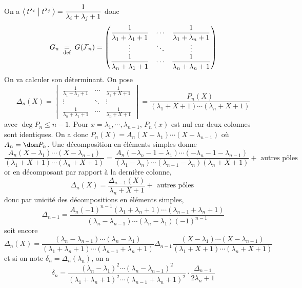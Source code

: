 On a $\scalar{t^{\lambda_i}}{t^{\lambda_j}} = \dfrac{1}{\lambda_i+\lambda_j+1}$ donc \[
    G_n\;\underset{\text{def}}=\; G(\mathcal  F_n)= \begin{pmatrix}
        \displaystyle \frac{1}{\lambda_1+\lambda_1+1} & \cdots  & \displaystyle\frac{1}{\lambda_1+\lambda_n+1} \\
        \vdots & \ddots & \vdots \\
        \displaystyle \frac{1}{\lambda_n+\lambda_1+1} & \cdots  & \displaystyle\frac{1}{\lambda_n+\lambda_n+1}
    \end{pmatrix}
\] 
On va calculer son déterminant. On pose \[
    \Delta_n(X)= \begin{vmatrix}
        \displaystyle \frac{1}{\lambda_1+\lambda_1+1} & \cdots  & \displaystyle\frac{1}{\lambda_1+X+1} \\
        \vdots & \ddots & \vdots \\
        \displaystyle \frac{1}{\lambda_n+\lambda_1+1} & \cdots  & \displaystyle\frac{1}{\lambda_n+X+1}
    \end{vmatrix}= \frac{P_n(X)}{(\lambda_1+X+1)\cdots (\lambda_n+X+1)}
\] 
avec $\deg P_n\leq n-1$. Pour $x=\lambda_1, \cdots , \lambda_{n-1}$, $P_n(x)$ est nul car deux colonnes sont identiques. On a donc $P_n(X)=A_n(X-\lambda_1)\cdots (X-\lambda_{n-1})$ où $A_n=\dom P_n$. Une décomposition en éléments simples donne \[
    \frac{A_n(X-\lambda_1)\cdots (X-\lambda_{n-1})}{(\lambda_1+X+1)\cdots (\lambda_n+X+1)}= \frac{A_n(-\lambda_{n}-1-\lambda_1)\cdots (-\lambda_n-1-\lambda_{n-1})}{(\lambda_1-\lambda_n)\cdots (\lambda_{n-1}-\lambda_n)(\lambda_n+X+1)}+\text{ autres pôles }
\] 
or en décomposant par rapport à la dernière colonne, \[
    \Delta_n(X)=\frac{\Delta_{n-1}(X)}{\lambda_n+X+1}+\text{ autres pôles }
\] 
donc par unicité des décompositions en éléments simples, \[
    \Delta_{n-1}= \frac{A_n(-1)^{n-1}(\lambda_1+\lambda_n+1)\cdots (\lambda_{n-1}+\lambda_n+1)}{(\lambda_n-\lambda_{n-1})\cdots (\lambda_n-\lambda_1)(-1)^{n-1}}
\] 
soit encore \[
    \Delta_n(X)= \frac{(\lambda_n-\lambda_{n-1})\cdots (\lambda_n-\lambda_1)}{(\lambda_1+\lambda_n+1)\cdots (\lambda_{n-1}+\lambda_n+1)}\Delta_{n-1} \frac{(X-\lambda_1)\cdots (X-\lambda_{n-1})}{(\lambda_1+X+1)\cdots (\lambda_n+X+1)}
\] 
et si on note $\delta_n=\Delta_n(\lambda_n)$, on a  \[
    \delta_n=\frac{(\lambda_n-\lambda_1)^2 \cdots (\lambda_n-\lambda_{n-1})^2 }{(\lambda_1+\lambda_n+1)^2 \cdots (\lambda_{n-1}+\lambda_n+1)^2 }\cdot \frac{\Delta_{n-1}}{2\lambda_n+1} %
\] 
